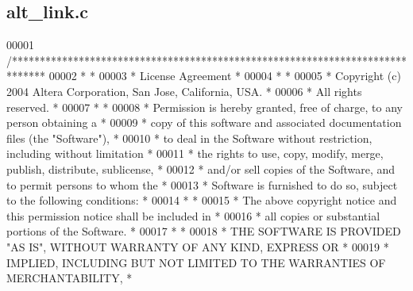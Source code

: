 \subsection{alt\+\_\+link.\+c}
\label{alt__link_8c_source}

\begin{DoxyCode}
00001 \textcolor{comment}{/******************************************************************************}
00002 \textcolor{comment}{*                                                                             *}
00003 \textcolor{comment}{* License Agreement                                                           *}
00004 \textcolor{comment}{*                                                                             *}
00005 \textcolor{comment}{* Copyright (c) 2004 Altera Corporation, San Jose, California, USA.           *}
00006 \textcolor{comment}{* All rights reserved.                                                        *}
00007 \textcolor{comment}{*                                                                             *}
00008 \textcolor{comment}{* Permission is hereby granted, free of charge, to any person obtaining a     *}
00009 \textcolor{comment}{* copy of this software and associated documentation files (the "Software"),  *}
00010 \textcolor{comment}{* to deal in the Software without restriction, including without limitation   *}
00011 \textcolor{comment}{* the rights to use, copy, modify, merge, publish, distribute, sublicense,    *}
00012 \textcolor{comment}{* and/or sell copies of the Software, and to permit persons to whom the       *}
00013 \textcolor{comment}{* Software is furnished to do so, subject to the following conditions:        *}
00014 \textcolor{comment}{*                                                                             *}
00015 \textcolor{comment}{* The above copyright notice and this permission notice shall be included in  *}
00016 \textcolor{comment}{* all copies or substantial portions of the Software.                         *}
00017 \textcolor{comment}{*                                                                             *}
00018 \textcolor{comment}{* THE SOFTWARE IS PROVIDED "AS IS", WITHOUT WARRANTY OF ANY KIND, EXPRESS OR  *}
00019 \textcolor{comment}{* IMPLIED, INCLUDING BUT NOT LIMITED TO THE WARRANTIES OF MERCHANTABILITY,    *}

\end{DoxyCode}
